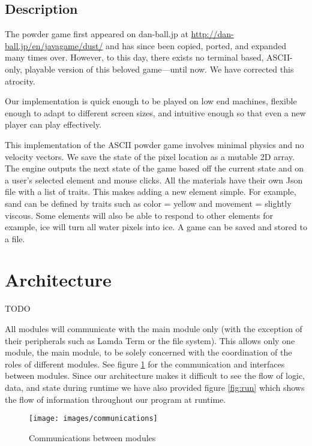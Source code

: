 \subsection{Description}
The powder game first appeared on dan-ball.jp at \url{http://dan-ball.jp/en/javagame/dust/} and has since been copied, ported, and expanded many times over. However, to this day, there exists no terminal based, ASCII-only, playable version of this beloved game---until now. We have corrected this atrocity.

Our implementation is quick enough to be played on low end machines, flexible enough to adapt to different screen sizes, and intuitive enough so that even a new player can play effectively. 

This implementation of the ASCII powder game involves minimal physics and no velocity vectors. We save the state of the pixel location as a mutable 2D array. The engine outputs the next state of the game based off the current state and on a user's selected element and mouse clicks. All the materials have their own Json file with a list of traits. This makes adding a new element simple. For example, sand can be defined by traits such as color = yellow and movement = slightly viscous. Some elements will also be able to respond to other elements for example, ice will turn all water pixels into ice. A game can be saved and stored to a file.

\section{Architecture}
TODO

All modules will communicate with the main module only (with the exception of their
peripherals such as Lamda Term or the file system). This allows only one module, the
main module, to be solely concerned with the coordination of the roles of different
modules. See figure \ref{fig:com} for the communication and interfaces between modules.
Since our architecture makes it difficult to see the flow of logic, data, and state during
runtime we have also provided figure \ref{fig:run} which shows the flow of information
throughout our program at runtime.

\begin{figure}[H]
  \caption{Communications between modules}
  \label{fig:com}
  \vspace{3em}
  \center\texttt{[image: images/communications]}
\end{figure}

